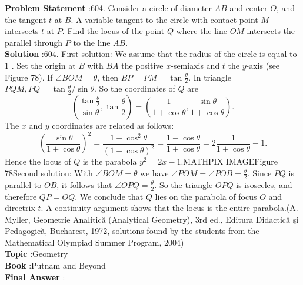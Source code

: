 \documentclass[10pt]{article}
\begin{document}
\textbf{Problem Statement} :604. Consider a circle of diameter $A B$ and center $O$, and the tangent $t$ at $B$. A variable tangent to the circle with contact point $M$ intersects $t$ at $P$. Find the locus of the point $Q$ where the line $O M$ intersects the parallel through $P$ to the line $A B$.\\
\textbf{Solution} :604. First solution: We assume that the radius of the circle is equal to 1 . Set the origin at $B$ with $B A$ the positive $x$-semiaxis and $t$ the $y$-axis (see Figure 78). If $\angle B O M=\theta$, then $B P=P M=\tan \frac{\theta}{2}$. In triangle $P Q M, P Q=\tan \frac{\theta}{2} / \sin \theta$. So the coordinates of $Q$ are$$ \left(\frac{\tan \frac{\theta}{2}}{\sin \theta}, \tan \frac{\theta}{2}\right)=\left(\frac{1}{1+\cos \theta}, \frac{\sin \theta}{1+\cos \theta}\right) . $$The $x$ and $y$ coordinates are related as follows:$$ \left(\frac{\sin \theta}{1+\cos \theta}\right)^{2}=\frac{1-\cos ^{2} \theta}{(1+\cos \theta)^{2}}=\frac{1-\cos \theta}{1+\cos \theta}=2 \frac{1}{1+\cos \theta}-1 . $$Hence the locus of $Q$ is the parabola $y^{2}=2 x-1$.MATHPIX IMAGEFigure 78Second solution: With $\angle B O M=\theta$ we have $\angle P O M=\angle P O B=\frac{\theta}{2}$. Since $P Q$ is parallel to $O B$, it follows that $\angle O P Q=\frac{\theta}{2}$. So the triangle $O P Q$ is isosceles, and therefore $Q P=O Q$. We conclude that $Q$ lies on the parabola of focus $O$ and directrix $t$. A continuity argument shows that the locus is the entire parabola.(A. Myller, Geometrie Analitică (Analytical Geometry), 3rd ed., Editura Didactică şi Pedagogică, Bucharest, 1972, solutions found by the students from the Mathematical Olympiad Summer Program, 2004)\\
\textbf{Topic} :Geometry\\
\textbf{Book} :Putnam and Beyond\\
\textbf{Final Answer} :\\
\end{document}
